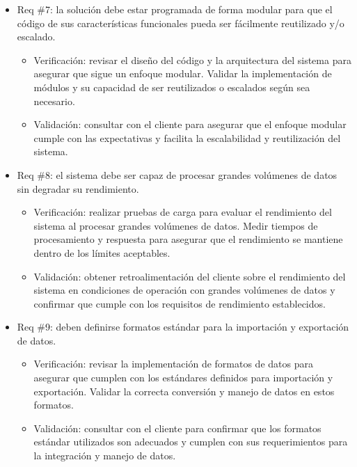 \documentclass[
11pt, %
codirector, %
]{charter}
\begin{document}
\begin{itemize} 
\item Req \#7: la solución debe estar programada de forma modular para que el código de sus características funcionales pueda ser fácilmente reutilizado y/o escalado.

\begin{itemize}
	\item Verificación: revisar el diseño del código y la arquitectura del sistema para asegurar que sigue un enfoque modular. Validar la implementación de módulos y su capacidad de ser reutilizados o escalados según sea necesario.
	\item Validación: consultar con el cliente para asegurar que el enfoque modular cumple con las expectativas y facilita la escalabilidad y reutilización del sistema.
\end{itemize}

\item Req \#8: el sistema debe ser capaz de procesar grandes volúmenes de datos sin degradar su rendimiento.

\begin{itemize}
	\item Verificación: realizar pruebas de carga para evaluar el rendimiento del sistema al procesar grandes volúmenes de datos. Medir tiempos de procesamiento y respuesta para asegurar que el rendimiento se mantiene dentro de los límites aceptables.
	\item Validación: obtener retroalimentación del cliente sobre el rendimiento del sistema en condiciones de operación con grandes volúmenes de datos y confirmar que cumple con los requisitos de rendimiento establecidos.
\end{itemize}

\item Req \#9: deben definirse formatos estándar para la importación y exportación de datos.

\begin{itemize}
	\item Verificación: revisar la implementación de formatos de datos para asegurar que cumplen con los estándares definidos para importación y exportación. Validar la correcta conversión y manejo de datos en estos formatos.
	\item Validación: consultar con el cliente para confirmar que los formatos estándar utilizados son adecuados y cumplen con sus requerimientos para la integración y manejo de datos.
\end{itemize}
\end{itemize}
\end{document}
